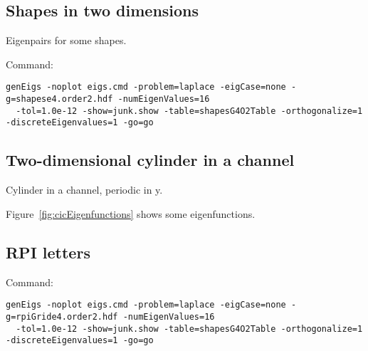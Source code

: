 \documentclass[preprint,11pt]{elsarticle}
\begin{document}
\subsection{Shapes in two dimensions} \label{sec:shapes}

Eigenpairs for some shapes.

\mni
Command:
\begin{Verbatim}[fontsize=\footnotesize]
genEigs -noplot eigs.cmd -problem=laplace -eigCase=none -g=shapese4.order2.hdf -numEigenValues=16 
  -tol=1.0e-12 -show=junk.show -table=shapesG4O2Table -orthogonalize=1 -discreteEigenvalues=1 -go=go
\end{Verbatim}







\clearpage
\subsection{Two-dimensional cylinder in a channel}   \label{sec:cylinderInAchannel}

Cylinder in a channel, periodic in y.




Figure~\ref{fig:cicEigenfunctions} shows some eigenfunctions.





\clearpage
\subsection{RPI letters}  \label{sec:rpi}

\mni
Command:
\begin{Verbatim}[fontsize=\footnotesize]
genEigs -noplot eigs.cmd -problem=laplace -eigCase=none -g=rpiGride4.order2.hdf -numEigenValues=16 
  -tol=1.0e-12 -show=junk.show -table=shapesG4O2Table -orthogonalize=1 -discreteEigenvalues=1 -go=go
\end{Verbatim}







\clearpage
\end{document}
